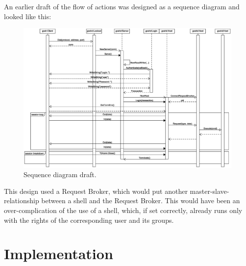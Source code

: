 \documentclass[10pt,a4paper,titlepage,twoside,english,final]{zhawreprt}
\begin{document}
An earlier draft of the flow of actions was designed as a sequence diagram and looked like this:
\begin{figure}[ht]
\includegraphics[width=\textwidth]{SequenceDiagram}
\caption{Sequence diagram draft.}
\label{fig:SeqDiaOriginal}
\end{figure}

This design used a \gls{Request Broker}, which would put another master-slave-relationship between a \gls{shell} and the \gls{Request Broker}. This would have been an over-complication of the use of a \gls{shell}, which, if set correctly, already runs only with the rights of the corresponding user and its groups.



\chapter{Implementation}\label{chp:Implementation}
\end{document}

